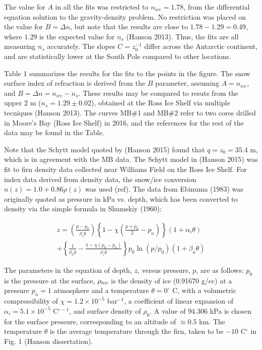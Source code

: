 \documentclass[12pt]{article}
\begin{document}
The value for $A$ in all the fits was restricted to $n_{ice} = 1.78$, from the differential equation solution to the gravity-density problem.  No restriction was placed on the value for $B=\Delta n$, but note that the results are close to $1.78-1.29 = 0.49$, where $1.29$ is the expected value for $n_s$ (Hanson 2013).  Thus, the fits are all measuring $n_s$ accurately.  The slopes $C = z_0^{-1}$ differ across the Antarctic continent, and are statistically lower at the South Pole compared to other locations.

Table 1 summarizes the results for the fits to the points in the figure.  The snow surface index of refraction is derived from the $B$ parameter, assuming $A = n_{ice}$, and $B = \Delta n = n_{ice} - n_s$.  These results may be compared to resuts from the upper 2 m ($n_s = 1.29\pm0.02$), obtained at the Ross Ice Shelf via multiple tecniques (Hanson 2013).  The curves MB\#1 and MB\#2 refer to two cores drilled in Moore's Bay (Ross Ice Shelf) in 2016, and the references for the rest of the data may be found in the Table.

Note that the Schytt model quoted by (Hanson 2015) found that $q = z_0 = 35.4$ m, which is in agreement with the MB data.  The Schytt model in (Hanson 2015) was fit to firn density data collected near Williams Field on the Ross Ice Shelf.  For index data derived from density data, the snow/ice conversion $n(z) = 1.0 + 0.86\rho(z)$ was used (ref).  The data from Ebinuma (1983) was originally quoted as pressure in kPa vs. depth, which has been converted to density via the simple formula in Shumskiy (1960):

\begin{multline}
z = \left( \frac{p-p_0}{\rho_i g}\right) \left \lbrace 1-\chi\left(\frac{p+p_0}{2} - p_n \right) \right \rbrace (1+\alpha_i\theta) \\ + \left \lbrace \frac{1}{\rho_0 g}-\frac{1-\chi(p_0-p_n)}{\rho_i g} \right \rbrace p_0 \ln (p/p_0) (1+\beta_a\theta)
\end{multline}

The parameters in the equation of depth, $z$, versus pressure, $p$, are as follows: $p_0$ is the pressure at the surface, $\rho_{\rm ice}$ is the density of ice (0.91670 g/cc) at a pressure $p_n=1$ atmosphere and a temperature $\theta = 0^{\circ}$ C, with a  volumetric compressibility of $\chi = 1.2 \times 10^{-5}$ bar$^{-1}$, a coefficient of linear expansion of $\alpha_i = 5.1 \times 10^{-5}$ C$^{\circ -1}$, and surface density of $\rho_0$.  A value of $94.306$ kPa is chosen for the surface pressure, corresponding to an altitude of $\approx 0.5$ km.  The temperature $\theta$ is the average temperature through the firn, taken to be $-10$ C$^{\circ}$ in Fig. 1 (Hanson dissertation).
\end{document}
